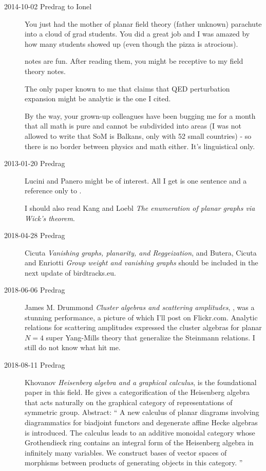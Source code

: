 \begin{description}
\item[2014-10-02 Predrag to Ionel]
 You just had the mother of planar field theory (father unknown)
 parachute into a cloud of grad students. You did a great job and I was
 amazed by how many students showed up (even though the pizza is
 atrocious).

 notes are fun. After reading them, you might be receptive to my
 {field theory notes}.

The only paper known to me that claims that QED perturbation expansion
might be analytic is the one I cited.

By the way, your grown-up colleagues have been bugging me for a month
that all math is pure and cannot be subdivided into areas (I was not
allowed to write that SoM is Balkans, only with 52 small countries) - so
there is no border between physics and math either. It's linguistical
only.

\item[2013-01-20 Predrag]
Lucini and Panero 
might be of interest. All I get is one sentence and a reference only
to .

I should also read Kang and Loebl
{\em The enumeration of planar graphs via {Wick}'s theorem}.

\item[2018-04-28 Predrag]
Cicuta {\em Vanishing graphs, planarity, and {Reggeization}},
and
Butera, Cicuta and Enriotti {\em Group weight and vanishing graphs}
should be included in the next update of birdtracks.eu.

\item[2018-06-06 Predrag]

{James M. Drummond} {\em Cluster algebras and scattering amplitudes},
, was a stunning performance, a picture of which I'll
post on Flickr.com. Analytic relations for scattering amplitudes
expressed the cluster algebras for planar $N=4$ super Yang-Mills theory
that generalize the Steinmann relations.  I still do not know what hit
me.

\item[2018-08-11 Predrag]
Khovanov {\em Heisenberg algebra and a graphical calculus},
 is the foundational paper in this field.
He gives a categorification of the Heisenberg algebra that acts naturally
on the graphical category of representations  of  symmetric  group.
Abstract: ``
A new calculus of planar diagrams involving diagrammatics for biadjoint
functors and degenerate affine Hecke algebras is introduced. The calculus
leads to an additive monoidal category whose Grothendieck ring contains
an integral form of the Heisenberg algebra in infinitely many variables.
We construct bases of vector spaces of morphisms between products of
generating objects in this category.
''


\end{description}
